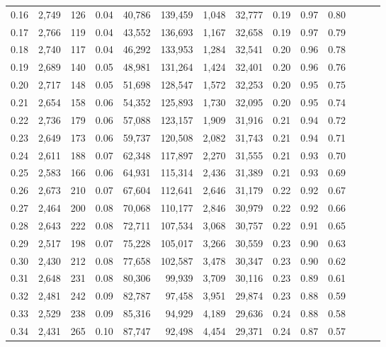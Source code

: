 \begin{tabular}{rrrrrrrrrrrrrr}
0.16 &  2,749 &  126 &  0.04 &   40,786 &  139,459 &   1,048 &  32,777 &  0.19 &  0.97 &      0.80 \\
0.17 &  2,766 &  119 &  0.04 &   43,552 &  136,693 &   1,167 &  32,658 &  0.19 &  0.97 &      0.79 \\
0.18 &  2,740 &  117 &  0.04 &   46,292 &  133,953 &   1,284 &  32,541 &  0.20 &  0.96 &      0.78 \\
0.19 &  2,689 &  140 &  0.05 &   48,981 &  131,264 &   1,424 &  32,401 &  0.20 &  0.96 &      0.76 \\
0.20 &  2,717 &  148 &  0.05 &   51,698 &  128,547 &   1,572 &  32,253 &  0.20 &  0.95 &      0.75 \\
0.21 &  2,654 &  158 &  0.06 &   54,352 &  125,893 &   1,730 &  32,095 &  0.20 &  0.95 &      0.74 \\
0.22 &  2,736 &  179 &  0.06 &   57,088 &  123,157 &   1,909 &  31,916 &  0.21 &  0.94 &      0.72 \\
0.23 &  2,649 &  173 &  0.06 &   59,737 &  120,508 &   2,082 &  31,743 &  0.21 &  0.94 &      0.71 \\
0.24 &  2,611 &  188 &  0.07 &   62,348 &  117,897 &   2,270 &  31,555 &  0.21 &  0.93 &      0.70 \\
0.25 &  2,583 &  166 &  0.06 &   64,931 &  115,314 &   2,436 &  31,389 &  0.21 &  0.93 &      0.69 \\
0.26 &  2,673 &  210 &  0.07 &   67,604 &  112,641 &   2,646 &  31,179 &  0.22 &  0.92 &      0.67 \\
0.27 &  2,464 &  200 &  0.08 &   70,068 &  110,177 &   2,846 &  30,979 &  0.22 &  0.92 &      0.66 \\
0.28 &  2,643 &  222 &  0.08 &   72,711 &  107,534 &   3,068 &  30,757 &  0.22 &  0.91 &      0.65 \\
0.29 &  2,517 &  198 &  0.07 &   75,228 &  105,017 &   3,266 &  30,559 &  0.23 &  0.90 &      0.63 \\
0.30 &  2,430 &  212 &  0.08 &   77,658 &  102,587 &   3,478 &  30,347 &  0.23 &  0.90 &      0.62 \\
0.31 &  2,648 &  231 &  0.08 &   80,306 &   99,939 &   3,709 &  30,116 &  0.23 &  0.89 &      0.61 \\
0.32 &  2,481 &  242 &  0.09 &   82,787 &   97,458 &   3,951 &  29,874 &  0.23 &  0.88 &      0.59 \\
0.33 &  2,529 &  238 &  0.09 &   85,316 &   94,929 &   4,189 &  29,636 &  0.24 &  0.88 &      0.58 \\
0.34 &  2,431 &  265 &  0.10 &   87,747 &   92,498 &   4,454 &  29,371 &  0.24 &  0.87 &      0.57 \\

\end{tabular}
